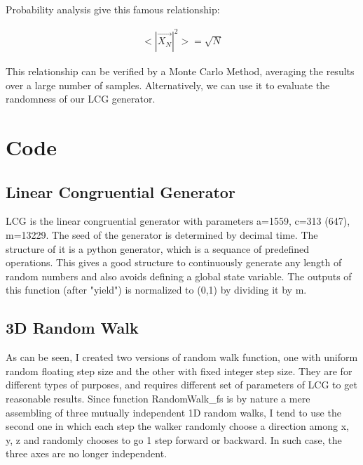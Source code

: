 \documentclass{article}
\begin{document}
Probability analysis give this famous relationship:

\begin{align*}
  <|\vec{X_N}|^2> = \sqrt{N} 
\end{align*}

This relationship can be verified by a Monte Carlo Method, averaging the results
over a large number of samples. Alternatively, we can use it to evaluate the 
randomness of our LCG generator.
\section{Code}

\subsection{Linear Congruential Generator}



LCG is the linear congruential generator with parameters a=1559, c=313 (647),
m=13229. The seed of the generator is determined by decimal time. The structure of it
is a python generator, which is a sequance of predefined operations. This gives a good 
structure to continuously generate any length of random numbers and also avoids defining
a global state variable. The outputs of this function (after "yield") is normalized to 
(0,1) by dividing it by m. 

\subsection{3D Random Walk}





As can be seen, I created two versions of random walk function, one with uniform random
floating step size and the other with fixed integer step size. They are for different 
types of purposes, and requires different set of parameters of LCG to get reasonable 
results. Since function RandomWalk\_fs is by nature a mere assembling of three 
mutually independent 1D random walks, I tend to use the second one in which each step
the walker randomly choose a direction among x, y, z and randomly chooses to go 1 step
forward or backward. In such case, the three axes are no longer independent.
\end{document}

